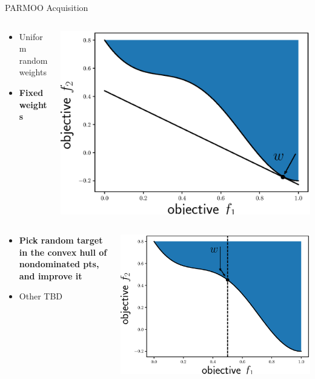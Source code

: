 \documentclass[aspectratio=169]{beamer}
\begin{document}
\begin{frame}{PARMOO Acquisition}
\begin{columns}
\begin{column}{.6\textwidth}
\begin{itemize}
\item Uniform random weights
\item {\bf Fixed weights}
\end{itemize}
\end{column}
\begin{column}{.35\textwidth}
\includegraphics[width=\textwidth]{weights.eps}
\end{column}
\end{columns}
\pause
\begin{columns}
\begin{column}{.6\textwidth}
\begin{itemize}
\item {\bf Pick random target in the convex hull of nondominated pts,
and improve it}
\item Other TBD
\end{itemize}
\end{column}
\begin{column}{.35\textwidth}
\includegraphics[width=\textwidth]{set_target.eps}
\end{column}
\end{columns}
\end{frame}
\end{document}
